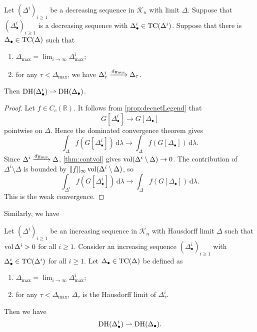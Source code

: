 \begin{lemma}\label{lma:DHmconv}
    Let $(\Delta^i)_{i\geq 1}$ be a decreasing sequence in $\mathcal{K}_n$ with limit $\Delta$.
    Suppose that $(\Delta_{\bullet}^i)_{i\geq 1}$ is a decreasing sequence with $\Delta_{\bullet}^i\in \mathrm{TC}(\Delta^i)$.
    Suppose that there is $\Delta_{\bullet}\in \mathrm{TC}(\Delta)$ such that
    \begin{enumerate}
        \item\label{itm:lma:DHmconv:1} $\Delta_{\max}=\lim_{i\to\infty}\Delta^i_{\max}$;
        \item\label{itm:lma:DHmconv:2} for any $\tau<\Delta_{\max}$, we have $\Delta^i_{\tau}\xrightarrow{d_{\mathrm{Haus}}}\Delta_{\tau}$.
    \end{enumerate}
    Then $\operatorname{DH}(\Delta_{\bullet}^i)\rightharpoonup \operatorname{DH}(\Delta_{\bullet})$.
\end{lemma}
\begin{proof}
    Let $f\in C_c(\mathbb{R})$. It follows from \cref{prop:decnetLegend} that
    \[
    G[\Delta_{\bullet}^i]\to G[\Delta_{\bullet}]
    \]
    pointwise on $\Delta$.
    Hence the dominated convergence theorem gives
    \[
        \int_{\Delta} f(G[\Delta_{\bullet}^i])\,\mathrm{d}\lambda\to \int_{\Delta} f(G[\Delta_{\bullet}])\,\mathrm{d}\lambda.
    \]
    Since $\Delta^i\xrightarrow{d_{\mathrm{Haus}}}\Delta$, \cref{thm:contvol} gives $\operatorname{vol}(\Delta^i\setminus \Delta)\to 0$. The contribution of $\Delta^i\setminus\Delta$ is bounded by $\|f\|_{\infty}\operatorname{vol}(\Delta^i\setminus\Delta)$, so
    \[
        \int_{\Delta^i} f(G[\Delta_{\bullet}^i])\,\mathrm{d}\lambda\to \int_{\Delta} f(G[\Delta_{\bullet}])\,\mathrm{d}\lambda.
    \]
    This is the weak convergence.
\end{proof}
Similarly, we have
\begin{lemma}\label{lma:DHmconv2}
    Let $(\Delta^i)_{i\geq 1}$ be an increasing sequence in $\mathcal{K}_n$ with Hausdorff limit $\Delta$ such that $\operatorname{vol} \Delta^i>0$ for all $i\geq 1$. Consider an increasing sequence $(\Delta^i_{\bullet})_{i\geq 1}$ with $\Delta^i_{\bullet}\in \mathrm{TC}(\Delta^i)$ for all $i\geq 1$.
    Let $\Delta_{\bullet}\in \mathrm{TC}(\Delta)$ be defined as
    \begin{enumerate}
        \item\label{itm:lma:DHmconv2:1} $\Delta_{\max}=\lim_{i\to\infty}\Delta^i_{\max}$;
        \item\label{itm:lma:DHmconv2:2} for any $\tau<\Delta_{\max}$, $\Delta_{\tau}$ is the Hausdorff limit of $\Delta^i_{\tau}$.
    \end{enumerate}
    Then we have
    \[
    \operatorname{DH}(\Delta_{\bullet}^i)\rightharpoonup \operatorname{DH}(\Delta_{\bullet}).
    \]
\end{lemma}
